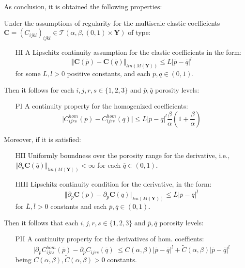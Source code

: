 As conclusion, it is obtained the following properties:
\begin{prop}
Under the assumptions of regularity for the multiscale elastic coefficients $\mathbf{C} = (C_{ijkl})_{ijkl} \in \mathcal{T}(\alpha, \beta, (0,1)\times \mathbf{Y})$ of type:
\begin{enumerate}
    \item[HI] A Lipschitz continuity assumption for the elastic coefficients in the form:
    \begin{equation*}
        \Vert \mathbf{C}(\overline{p}) - \mathbf{C}(\overline{q}) \Vert_{lin(M(\mathbf{Y}))} \leq L \vert \overline{p} - \overline{q} \vert^{l} 
    \end{equation*}
    for some $L, l > 0$ positive constants, and each $\overline{p},\overline{q} \in (0,1)$.
\end{enumerate}
Then it follows for each $i,j,r,s \in \{1,2,3\}$ and $\overline{p},\overline{q}$ porosity levels:
\begin{enumerate}
    \item[PI] A continuity property for the homogenized coefficients:
    \begin{equation*}
        \vert C_{ijrs}^{hom}(\overline{p})-C^{hom}_{ijrs}(\overline{q}) \vert \leq L \vert \overline{p} - \overline{q} \vert^{l} \frac{\beta}{\alpha} (1+\frac{\beta}{\alpha})
    \end{equation*}
\end{enumerate}

Moreover, if it is satisfied:
\begin{enumerate}
    \item[HII] Uniformly boundness over the porosity range for the derivative, i.e., $\Vert \partial_p \mathbf{C}(\overline{q}) \Vert_{lin(M(\mathbf{Y}))} < \infty$ for each $\overline{q} \in (0,1)$.
    \item[HIII] Lipschitz continuity condition for the derivative, in the form:
    \begin{equation*}
        \Vert \partial_p \mathbf{C}(\overline{p})- \partial_p \mathbf{C}(\overline{q}) \Vert_{lin(M(\mathbf{Y}))} \leq \overline{L} \vert \overline{p}-\overline{q}\vert^{\overline{l}}
    \end{equation*}
    for $\overline{L}, \overline{l} > 0$ constants and each $\overline{p},\overline{q} \in (0,1)$.
\end{enumerate}
Then it follows that each $i,j,r,s \in \{1,2,3\}$ and $\overline{p},\overline{q}$ porosity levels:
\begin{enumerate}
    \item[PII] A continuity property for the derivatives of hom. coeffients:
    \begin{equation*}
        \vert \partial_p C_{ijrs}^{hom}(\overline{p})-\partial_p C_{ijrs}(\overline{q}) \vert \leq C(\alpha, \beta) \vert \overline{p}-\overline{q} \vert^{\overline{l}} + \tilde{C}(\alpha, \beta) \vert \overline{p}-\overline{q} \vert^{l}
    \end{equation*}
    being $C(\alpha,\beta), \tilde{C}(\alpha,\beta) > 0$ constants.
\end{enumerate}
\end{prop}